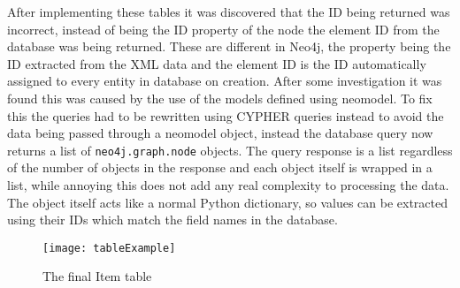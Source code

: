 After implementing these tables it was discovered that the ID being returned was incorrect, instead of being the ID property of the node the 
element ID from the database was being returned. These are different in Neo4j, the property being the ID extracted from the XML data and the element ID is the 
ID automatically assigned to every entity in database on creation. After some investigation it was found this was caused by the use of 
the models defined using neomodel. To fix this the queries had to be rewritten using CYPHER queries instead to avoid the data being passed through 
a neomodel object, instead the database query now returns a list of \verb|neo4j.graph.node| objects. The query response is a list regardless of 
the number of objects in the response and each object itself is wrapped in a list, while annoying this does not add any real complexity to processing the data. 
The object itself acts like a normal Python dictionary, so values can be extracted using their IDs which match the field names in the database.
\begin{figure}
    \centering
    \texttt{[image: tableExample]}
    \caption{The final Item table}
\end{figure}
